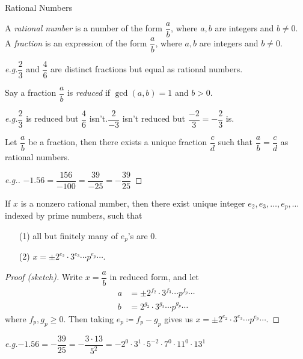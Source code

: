 \vspace*{2em}

\begin{center}
{\Large Rational Numbers}
\end{center}

\begin{definition}
A \emph{rational number} is a number of the form $\dfrac{a}{b}$, where $a,b$ are integers and $b \neq 0$.\\[0.1em]
A \emph{fraction} is an expression of the form $\dfrac{a}{b}$, where $a,b$ are integers and $b \neq 0$.
\end{definition}
\emph{e.g.}\quad $\dfrac{2}{3}$ and $\dfrac{4}{6}$ are distinct fractions but equal as rational numbers.

\vspace*{1em}

\begin{definition}
Say a fraction $\dfrac{a}{b}$ is \emph{reduced} if $\gcd(a,b) = 1$ and $b> 0$.
\end{definition}
\emph{e.g.}\quad $\dfrac{2}{3}$ is reduced but $\dfrac{4}{6}$ isn't.\quad $\dfrac{2}{-3}$ isn't reduced but $\dfrac{-2}{3} = -\dfrac{2}{3}$ is.

\vspace*{1em}

\begin{theorem}\label{reducedfraction}
Let $\dfrac{a}{b}$ be a fraction, then there exists a unique fraction $\dfrac{c}{d}$ such that $\dfrac{a}{b} = \dfrac{c}{d}$ as rational numbers.
\end{theorem}
\begin{proof}[e.g.]\renewcommand{\qedsymbol}{}
$-1.56 = \dfrac{156}{-100} = \dfrac{39}{-25} = -\dfrac{39}{25}$
\end{proof}

\vspace*{1em}

\begin{proposition}
If $x$ is a nonzero rational number, then there exist unique integer $e_2,e_3,\ldots,e_p,\ldots$ indexed by prime numbers, such that
\begin{itemize}
\item[(1)] all but finitely many of $e_p$'s are $0$.
\item[(2)] $x = \pm 2^{e_2}\cdot 3^{e_3}\cdots p^{e_p}\cdots$.
\end{itemize}
\end{proposition}
\begin{proof}[Proof (sketch)]
Write $x = \dfrac{a}{b}$ in reduced form, and let
\begin{align*}
a &= \pm 2^{f_2}\cdot 3^{f_3}\cdots p^{f_p}\cdots\\[0.5em]
b &= 2^{g_2}\cdot 3^{g_3}\cdots p^{g_p}\cdots
\end{align*}
where $f_p,g_p \geq 0$. Then taking $e_p \coloneqq f_p - g_p$ gives us $x = \pm 2^{e_2}\cdot 3^{e_3}\cdots p^{e_p}\cdots$.
\end{proof}
\vspace*{0.5em}
\emph{e.g.}\quad $-1.56 = -\dfrac{39}{25} = -\dfrac{3\cdot 13}{5^2} = -2^0\cdot 3^1\cdot 5^{-2}\cdot 7^0\cdot 11^0\cdot 13^1$

